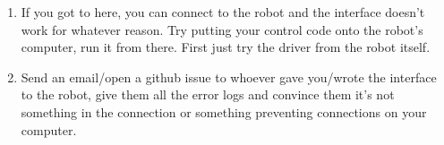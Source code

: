 \begin{enumerate}
	Try nc -kl ROBOT\_IP 7777 on robot also. Try using different ports.
	Make sure it works the other way around, i.e. nc -kl on your machine , nc from robot (-l is listening, meaning that's the server).
\item If you got to here, you can connect to the robot and the interface doesn't work for whatever reason.
	Try putting your control code onto the robot's computer, run it from there. First just try the driver from the robot itself.
\item Send an email/open a github issue to whoever gave you/wrote the interface to the robot, give them all the error logs
	and convince them it's not something in the connection or something preventing connections on your computer.
\end{enumerate}
